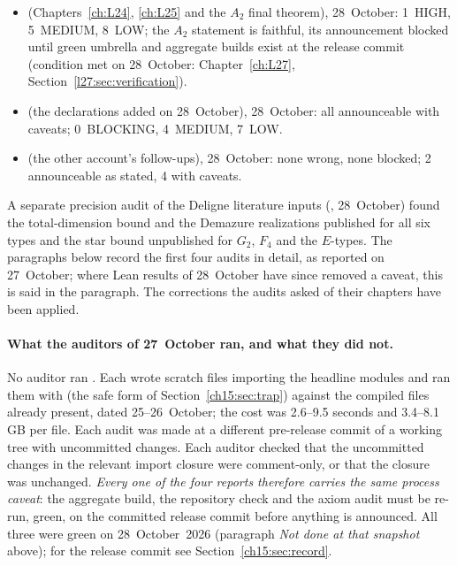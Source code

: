 \begin{itemize}
\item {} (Chapters~\ref{ch:L24}, \ref{ch:L25} and the $A_2$ final theorem), 28~October:
  1~HIGH, 5~MEDIUM, 8~LOW; the $A_2$ statement is faithful, its announcement blocked until green umbrella and aggregate
  builds exist at the release commit (condition met on 28~October: Chapter~\ref{ch:L27}, Section~\ref{l27:sec:verification}).
\item {} (the declarations added on 28~October), 28~October: all announceable with
  caveats; 0~BLOCKING, 4~MEDIUM, 7~LOW.
\item {} (the other account's follow-ups), 28~October: none wrong, none blocked; 2
  announceable as stated, 4 with caveats.
\end{itemize}
A separate precision audit of the Deligne literature inputs (, 28~October) found the
total-dimension bound and the Demazure realizations published for all six types and the star bound unpublished for
$G_2$, $F_4$ and the $E$-types. The paragraphs below record the first four audits in detail, as reported on 27~October;
where Lean results of 28~October have since removed a caveat, this is said in the paragraph. The corrections the
audits asked of their chapters have been applied.

\paragraph{What the auditors of 27~October ran, and what they did not.} No auditor ran . Each wrote scratch files
importing the headline modules and ran them with  (the safe form of
Section~\ref{ch15:sec:trap}) against the compiled  files already present, dated 25--26~October; the cost was
2.6--9.5 seconds and 3.4--8.1\,GB per file. Each audit was made at a different pre-release commit of a working tree with uncommitted
changes. Each
auditor checked that the uncommitted changes in the relevant import closure were comment-only, or that the closure was
unchanged. \emph{Every one of the four reports therefore carries the same process caveat}: the aggregate build, the
repository check and the axiom audit must be re-run, green, on the committed release commit before anything is
announced. All three were green on 28~October~2026 (paragraph \emph{Not done at that snapshot} above); for the release
commit see Section~\ref{ch15:sec:record}.

